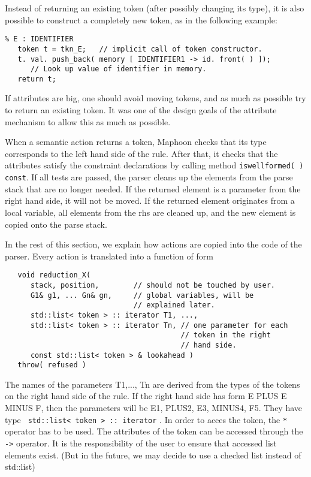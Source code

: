 \documentclass{article}
\begin{document}
\begin{enumerate}
   \noindent
   Instead of returning an existing token (after possibly changing its type),
   it is also possible to construct a completely new token, as in
   the following example:
\begin{verbatim}
% E : IDENTIFIER
   token t = tkn_E;   // implicit call of token constructor. 
   t. val. push_back( memory [ IDENTIFIER1 -> id. front( ) ]);
      // Look up value of identifier in memory. 
   return t;
\end{verbatim}

   \noindent  
   If attributes are big, one should avoid moving tokens, and
   as much as possible try to return an existing token. 
   It was one of the design goals of the attribute mechanism to 
   allow this as much as possible. 

\end{enumerate}


   
\noindent
When a semantic action returns a token, Maphoon checks that its type
corresponds to the left hand side of the
rule. After that, it checks that the attributes satisfy the constraint
declarations by calling method
\verb+iswellformed( ) const+. If all tests
are passed, the parser cleans up the
elements from the parse stack that are no longer needed. 
If the returned element is a parameter from
the right hand side, it will not be moved. 
If the returned element originates from
a local variable, all elements from the rhs are cleaned up,
and the new element is copied onto the parse stack.


In the rest of this section, we explain how actions are 
copied into the code of the parser. 
Every action is translated into a function of form

\begin{verbatim}
   void reduction_X( 
      stack, position,        // should not be touched by user. 
      G1& g1, ... Gn& gn,     // global variables, will be 
                              // explained later. 
      std::list< token > :: iterator T1, ...,
      std::list< token > :: iterator Tn, // one parameter for each 
                                         // token in the right 
                                         // hand side.
      const std::list< token > & lookahead ) 
   throw( refused )
\end{verbatim}

\noindent
The names of the parameters T1,..., Tn are derived
from the types of the tokens on the right hand side of the rule.
If the right hand side has form E PLUS E MINUS F, then the
parameters will be E1, PLUS2, E3, MINUS4, F5.
They have type \verb+ std::list< token > :: iterator+ . In order to
acces the token, the \verb+*+ operator 
has to be used.
The attributes of the token
can be accessed through the \verb+->+ operator. It is the responsibility
of the user to ensure that accessed list elements exist.
(But in the future, we may decide to use a checked list instead of
std::list)
\end{document}
